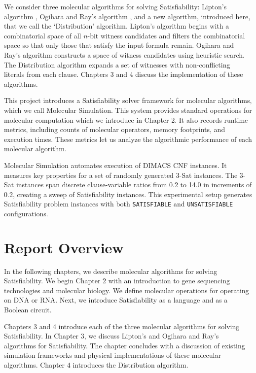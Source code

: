 We consider three molecular algorithms for solving {\sc Satisfiability}: Lipton's algorithm \cite{Lipton95usingdna}, Ogihara and Ray's algorithm \cite{Ogihara:1996:BFS:898228, Ogihara97dna-basedparallel}, and a new algorithm, introduced here, that we call the `Distribution' algorithm.  Lipton's algorithm begins with a combinatorial space of all $n$-bit witness candidates and filters the combinatorial space so that only those that satisfy the input formula remain.  Ogihara and Ray's algorithm constructs a space of witness candidates using heuristic search.  The Distribution algorithm expands a set of witnesses with non-conflicting literals from each clause.  Chapters 3 and 4 discuss the implementation of these algorithms.

This project introduces a {\sc Satisfiability} solver framework for molecular algorithms, which we call Molecular Simulation.  This system provides standard operations for molecular computation which we introduce in Chapter 2.  It also records runtime metrics, including counts of molecular operators, memory footprints, and execution times.  These metrics let us analyze the algorithmic performance of each molecular algorithm.

Molecular Simulation automates execution of DIMACS CNF instances.  It measures key properties for a set of randomly generated $3$-{\sc Sat} instances.  The $3$-{\sc Sat} instances span discrete clause-variable ratios from 0.2 to 14.0 in increments of 0.2, creating a sweep of {\sc Satisfiability} instances.  This experimental setup generates {\sc Satisfiability} problem instances with both \texttt{SATISFIABLE} and \texttt{UNSATISFIABLE} configurations.

\section{Report Overview}

In the following chapters, we describe molecular algorithms for solving {\sc Satisfiability}.  We begin Chapter 2 with an introduction to gene sequencing technologies and molecular biology.  We define molecular operations for operating on DNA or RNA.  Next, we introduce {\sc Satisfiability} as a language and as a Boolean circuit.

Chapters 3 and 4 introduce each of the three molecular algorithms for solving {\sc Satisfiability}.  In Chapter 3, we discuss Lipton's \cite{Lipton95usingdna, dnaComputingModels2008} and Ogihara and Ray's \cite{Ogihara:1996:BFS:898228, Ogihara97dna-basedparallel, dnaBasedImplemetation_Yoshida2000} algorithms for {\sc Satisfiability}.  The chapter concludes with a discussion of existing simulation frameworks and physical implementations of these molecular algorithms.  Chapter 4 introduces the Distribution algorithm.

